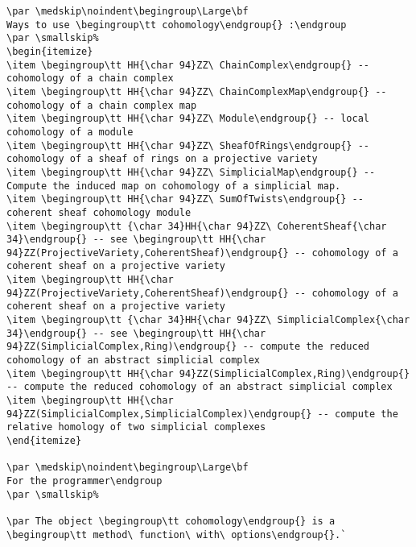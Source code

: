 \documentclass[12pt,a4paper]{amsart}
\begin{document}
\begin{lstlisting}[language=Macaulay2output]
\par \medskip\noindent\begingroup\Large\bf
Ways to use \begingroup\tt cohomology\endgroup{} :\endgroup
\par \smallskip%
\begin{itemize}
\item \begingroup\tt HH{\char 94}ZZ\ ChainComplex\endgroup{} -- cohomology of a chain complex
\item \begingroup\tt HH{\char 94}ZZ\ ChainComplexMap\endgroup{} -- cohomology of a chain complex map
\item \begingroup\tt HH{\char 94}ZZ\ Module\endgroup{} -- local cohomology of a module
\item \begingroup\tt HH{\char 94}ZZ\ SheafOfRings\endgroup{} -- cohomology of a sheaf of rings on a projective variety
\item \begingroup\tt HH{\char 94}ZZ\ SimplicialMap\endgroup{} -- Compute the induced map on cohomology of a simplicial map.
\item \begingroup\tt HH{\char 94}ZZ\ SumOfTwists\endgroup{} -- coherent sheaf cohomology module
\item \begingroup\tt {\char 34}HH{\char 94}ZZ\ CoherentSheaf{\char 34}\endgroup{} -- see \begingroup\tt HH{\char 94}ZZ(ProjectiveVariety,CoherentSheaf)\endgroup{} -- cohomology of a coherent sheaf on a projective variety
\item \begingroup\tt HH{\char 94}ZZ(ProjectiveVariety,CoherentSheaf)\endgroup{} -- cohomology of a coherent sheaf on a projective variety
\item \begingroup\tt {\char 34}HH{\char 94}ZZ\ SimplicialComplex{\char 34}\endgroup{} -- see \begingroup\tt HH{\char 94}ZZ(SimplicialComplex,Ring)\endgroup{} -- compute the reduced cohomology of an abstract simplicial complex
\item \begingroup\tt HH{\char 94}ZZ(SimplicialComplex,Ring)\endgroup{} -- compute the reduced cohomology of an abstract simplicial complex
\item \begingroup\tt HH{\char 94}ZZ(SimplicialComplex,SimplicialComplex)\endgroup{} -- compute the relative homology of two simplicial complexes
\end{itemize}

\par \medskip\noindent\begingroup\Large\bf
For the programmer\endgroup
\par \smallskip%

\par The object \begingroup\tt cohomology\endgroup{} is a \begingroup\tt method\ function\ with\ options\endgroup{}.`
\end{lstlisting}
\end{document}
